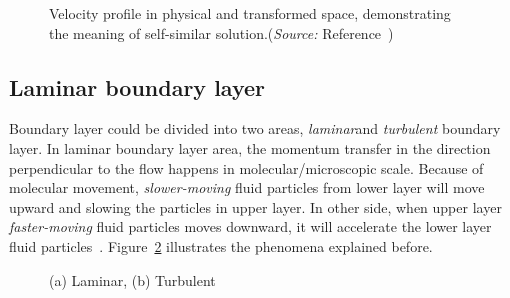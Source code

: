 \begin{figure}[h]
  \centering
  \caption{Velocity profile in physical and transformed space, demonstrating the meaning of self-similar solution.(\emph{Source:} Reference~\cite{JA})}
  \label{fig:vel_profile_2}
\end{figure}

\subsection{Laminar boundary layer}
Boundary layer could be divided into two areas, \emph{laminar}and \emph{turbulent} boundary layer. In laminar boundary layer area, the momentum transfer in the direction perpendicular to the flow happens in molecular/microscopic scale. Because of molecular movement, \emph{slower-moving} fluid particles from lower layer will move upward and slowing the particles in upper layer. In other side, when upper layer \emph{faster-moving} fluid particles moves downward, it will accelerate the lower layer fluid particles~\cite{JB}. Figure~\ref{fig:comparison} illustrates the phenomena explained before.

\begin{figure}
  \centering
  \caption{(a) Laminar, (b) Turbulent}
  \label{fig:comparison}
\end{figure}

